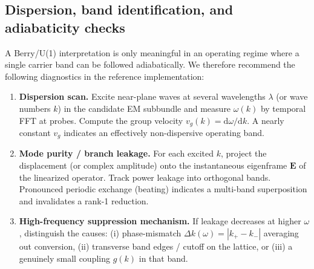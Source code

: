 \documentclass[11pt,a4paper]{article}
\providecommand{\dd}{\mathrm{d}}
\begin{document}
\subsection{Dispersion, band identification, and adiabaticity checks}
A Berry/U(1) interpretation is only meaningful in an operating regime where a single carrier band can be followed adiabatically.
We therefore recommend the following diagnostics in the reference implementation:
\begin{enumerate}
  \item \textbf{Dispersion scan.} Excite near-plane waves at several wavelengths \(\lambda\) (or wave numbers \(k\)) in the
        candidate EM subbundle and measure \(\omega(k)\) by temporal FFT at probes. Compute the group velocity
        \(v_g(k)=\dd\omega/\dd k\). A nearly constant \(v_g\) indicates an effectively non-dispersive operating band.
  \item \textbf{Mode purity / branch leakage.} For each excited \(k\), project the displacement (or complex amplitude) onto the
        instantaneous eigenframe \(\mathbf{E}\) of the linearized operator. Track power leakage into orthogonal bands.
        Pronounced periodic exchange (beating) indicates a multi-band superposition and invalidates a rank-1 reduction.
  \item \textbf{High-frequency suppression mechanism.} If leakage decreases at higher \(\omega\), distinguish the causes:
        (i) phase-mismatch \(\Delta k(\omega)=|k_+-k_-|\) averaging out conversion, (ii) transverse band edges / cutoff on the lattice,
        or (iii) a genuinely small coupling \(g(k)\) in that band.
\end{enumerate}
\end{document}
